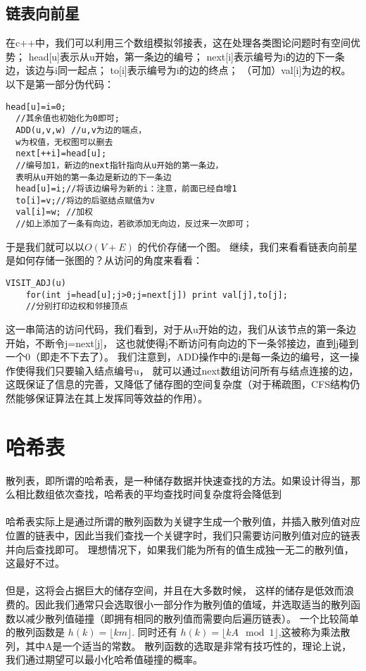 \documentclass[12pt,a4paper,UTF16]{ctexbook}
\theoremstyle{plain}
\begin{document}
\subsection{链表向前星}
在c++中，我们可以利用三个数组模拟邻接表，这在处理各类图论问题时有空间优势；
head[u]表示从u开始，第一条边的编号；
next[i]表示编号为i的边的下一条边，该边与i同一起点；
to[i]表示编号为i的边的终点；
（可加）val[i]为边的权。以下是第一部分伪代码：
\begin{lstlisting}[basicstyle=\ttfamily]
  head[u]=i=0;
  //其余值也初始化为0即可;
  ADD(u,v,w) //u,v为边的端点，
  w为权值，无权图可以删去
  next[++i]=head[u]; 
  //编号加1，新边的next指针指向从u开始的第一条边，
  表明从u开始的第一条边是新边的下一条边
  head[u]=i;//将该边编号为新的i：注意，前面已经自增1
  to[i]=v;//将边的后驱结点赋值为v
  val[i]=w; //加权
  //如上添加了一条有向边，若欲添加无向边，反过来一次即可；
\end{lstlisting}
于是我们就可以以$O(V+E)$
的代价存储一个图。
继续，我们来看看链表向前星是如何存储一张图的？从访问的角度来看看：
\begin{lstlisting}[basicstyle=\ttfamily]
  VISIT_ADJ(u)
    for(int j=head[u];j>0;j=next[j]) print val[j],to[j];
    //分别打印边权和邻接顶点
\end{lstlisting}
这一串简洁的访问代码，我们看到，对于从u开始的边，我们从该节点的第一条边开始，不断令j=next[j]，
这也就使得j不断访问有向边的下一条邻接边，直到j碰到一个0（即走不下去了）。
我们注意到，ADD操作中的i是每一条边的编号，这一操作使得我们只要输入结点编号u，
就可以通过next数组访问所有与结点连接的边，这既保证了信息的完善，又降低了储存图的空间复杂度（对于稀疏图，CFS结构仍然能够保证算法在其上发挥同等效益的作用）。
\section{哈希表}
散列表，即所谓的哈希表，是一种储存数据并快速查找的方法。如果设计得当，那么相比数组依次查找，哈希表的平均查找时间复杂度将会降低到  
\paragraph{}哈希表实际上是通过所谓的散列函数为关键字生成一个散列值，并插入散列值对应位置的链表中，因此当我们查找一个关键字时，我们只需要访问散列值对应的链表并向后查找即可。
理想情况下，如果我们能为所有的值生成独一无二的散列值，这最好不过。
\paragraph{}但是，这将会占据巨大的储存空间，并且在大多数时候，
这样的储存是低效而浪费的。因此我们通常只会选取很小一部分作为散列值的值域，并选取适当的散列函数以减少散列值碰撞（即拥有相同的散列值而需要向后遍历链表）。
一个比较简单的散列函数是 $h(k)=\lfloor km\rfloor.$
 同时还有 $h(k)=\lfloor kA\mod 1\rfloor$,这被称为乘法散列，其中A是一个适当的常数。
 散列函数的选取是非常有技巧性的，理论上说，我们通过期望可以最小化哈希值碰撞的概率。
\end{document}
